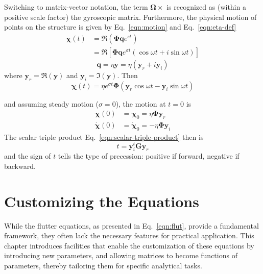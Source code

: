 \documentclass[10pt,openany,twoside]{book}
\numberwithin{equation}{section}   %
\newcommand{\Matrix}[1]{\boldsymbol{#1}}
\newcommand{\Vector}[1]{\boldsymbol{#1}}
\newcommand{\Eqn}[1]{Eq.\ \ref{#1}}
\begin{document}
Switching to matrix-vector notation, the term $\Vector{\Omega}\times$ is
recognized as (within a positive scale factor) the gyroscopic matrix.
Furthermore, the physical motion of points on the structure is given by
\Eqn{eqn:motion} and \Eqn{eqn:eta-def}
\begin{align} %
\Vector{\chi}(t) & =  \Re \left(\Matrix{\Phi}\Vector{q}e^{st}\right) \nonumber \\
              & =  \Re \left[\Matrix{\Phi}\Vector{q} e^{\sigma t}
				  			\left(\cos \omega t + i \sin \omega t \right) \right]	\nonumber
\end{align}
\begin{equation}
\Vector{q} = \eta \Vector{y} = \eta \left(\Vector{y}_r + i\Vector{y}_i \right) \nonumber
\end{equation}
where $\Vector{y}_r = \Re(\Vector{y})$ and $\Vector{y}_i = \Im(\Vector{y})$. Then
\begin{equation}
\Vector{\chi}(t) = \eta e^{\sigma t} \Matrix{\Phi}\left(\Vector{y}_r \cos \omega t
			- \Vector{y}_i \sin \omega t \right) \nonumber
\end{equation}

and assuming steady motion ($\sigma=0$), the motion at $t=0$ is
\begin{align}
\Vector{\chi}(0) &= \Vector{\chi}_0 = \eta\Matrix{\Phi}\Vector{y}_r \nonumber \\
\dot{\Vector{\chi}}(0) &= \dot{\Vector{\chi}}_0 =
		-\eta \Matrix{\Phi} \Vector{y}_i	\nonumber
\end{align}
The scalar triple product \Eqn{eqn:scalar-triple-product} then is
\begin{equation}
t = \Vector{y}_i^t\Matrix{G}\Vector{y}_r
\end{equation}
and the sign of $t$ tells the type of precession: positive if forward,
negative if backward.



\chapter{Customizing the Equations}\label{chap:tailoring}
While the flutter equations, as presented in \Eqn{eqn:flut}, provide
a fundamental framework, they often lack the necessary features for
practical application.
This chapter introduces facilities that enable
the customization of these equations by introducing new parameters, and
allowing matrices to become functions of parameters, thereby tailoring them
for specific analytical tasks.
\end{document}
